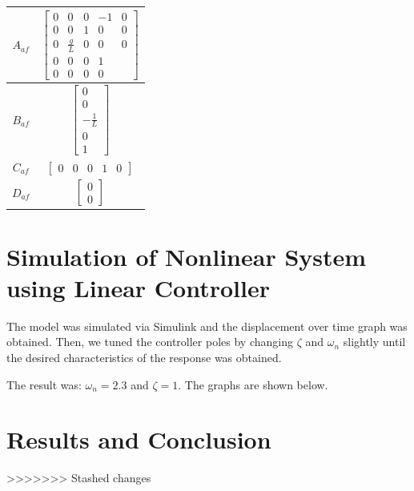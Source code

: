 \documentclass[10pt]{article}
\begin{document}
\begin{center}
    \begin{tabular}{| c | c |}
        \hline
        $A_{af}$ & $\begin{bmatrix}
                0 & 0 & 0 & -1 & 0 \\
                0 & 0 & 1 & 0 & 0 \\
                0 & \frac{g}{L} & 0 & 0 & 0 \\
                0 & 0 & 0 & 1 \\
                0 & 0 & 0 & 0
             \end{bmatrix}$ \\
        \hline
        $B_{af}$ & $\begin{bmatrix}
                0 \\ 0 \\ -\frac{1}{L} \\ 0 \\ 1
             \end{bmatrix}$ \\
        \hline
        $C_{af}$ & $\begin{bmatrix}
                0 & 0 & 0 & 1 & 0
             \end{bmatrix}$ \\
        \hline
        $D_{af}$ & $\begin{bmatrix}
                0 \\ 0
             \end{bmatrix}$ \\
        \hline
    \end{tabular}
\end{center}

\section{Simulation of Nonlinear System using Linear Controller}

The model was simulated via Simulink and the displacement over time graph was obtained. Then, we tuned the controller poles by changing $\zeta$ and $\omega_n$ slightly until the desired characteristics of the response was obtained.

The result was: $\omega_n = 2.3$ and $\zeta = 1$. The graphs are shown below.

\section{Results and Conclusion}

>>>>>>> Stashed changes
\end{document}
